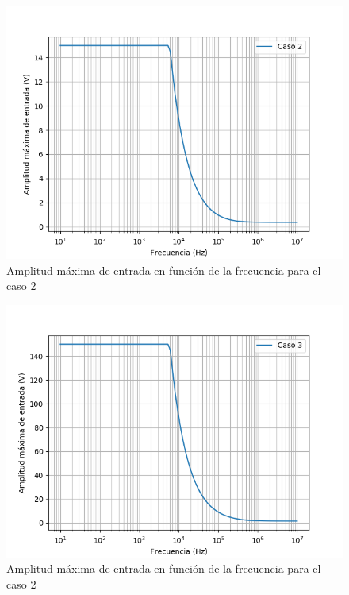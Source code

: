 \begin{figure}[H]
\begin{centering}
\includegraphics[scale=0.5]{../Ex1/iA/Resources1a/AmplMaxVsFreq2}
\par\end{centering}
\caption{Amplitud máxima de entrada en función de la frecuencia para el caso
2}
\label{1_a_24}

\end{figure}

\begin{figure}[H]
\begin{centering}
\includegraphics[scale=0.5]{../Ex1/iA/Resources1a/AmplMaxVsFreq3}
\par\end{centering}
\caption{Amplitud máxima de entrada en función de la frecuencia para el caso
2}
\label{1_a_25}

\end{figure}

